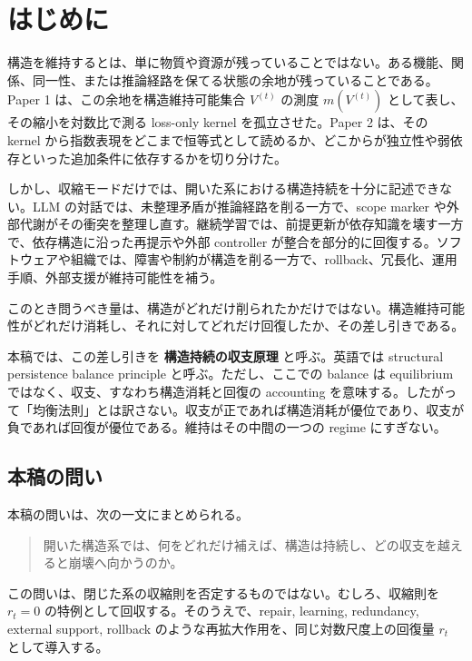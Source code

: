 \documentclass[12pt,a4paper]{article}
\begin{document}
\section{はじめに}\label{ux306fux3058ux3081ux306b}

構造を維持するとは、単に物質や資源が残っていることではない。ある機能、関係、同一性、または推論経路を保てる状態の余地が残っていることである。Paper 1 は、この余地を構造維持可能集合 \(V^{(t)}\) の測度 \(m(V^{(t)})\) として表し、その縮小を対数比で測る loss-only kernel を孤立させた。Paper 2 は、その kernel から指数表現をどこまで恒等式として読めるか、どこからが独立性や弱依存といった追加条件に依存するかを切り分けた。

しかし、収縮モードだけでは、開いた系における構造持続を十分に記述できない。LLM の対話では、未整理矛盾が推論経路を削る一方で、scope marker や外部代謝がその衝突を整理し直す。継続学習では、前提更新が依存知識を壊す一方で、依存構造に沿った再提示や外部 controller が整合を部分的に回復する。ソフトウェアや組織では、障害や制約が構造を削る一方で、rollback、冗長化、運用手順、外部支援が維持可能性を補う。

このとき問うべき量は、構造がどれだけ削られたかだけではない。構造維持可能性がどれだけ消耗し、それに対してどれだけ回復したか、その差し引きである。

本稿では、この差し引きを \textbf{構造持続の収支原理} と呼ぶ。英語では structural persistence balance principle と呼ぶ。ただし、ここでの balance は equilibrium ではなく、収支、すなわち構造消耗と回復の accounting を意味する。したがって「均衡法則」とは訳さない。収支が正であれば構造消耗が優位であり、収支が負であれば回復が優位である。維持はその中間の一つの regime にすぎない。

\subsection{本稿の問い}\label{ux672cux7a3fux306eux554fux3044}

本稿の問いは、次の一文にまとめられる。

\begin{quote}
開いた構造系では、何をどれだけ補えば、構造は持続し、どの収支を越えると崩壊へ向かうのか。
\end{quote}

この問いは、閉じた系の収縮則を否定するものではない。むしろ、収縮則を \(r_{t}=0\) の特例として回収する。そのうえで、repair, learning, redundancy, external support, rollback のような再拡大作用を、同じ対数尺度上の回復量 \(r_{t}\) として導入する。
\end{document}
